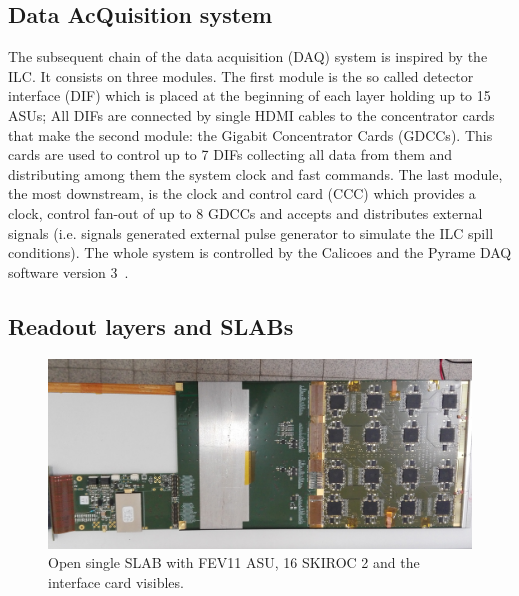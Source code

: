 \documentclass[a4paper,11pt]{article}
\begin{document}
\subsection{Data AcQuisition system}
\label{sec:DAQ}

The subsequent chain of the data acquisition (DAQ)\cite{Gastaldi:2014vaa} system is inspired by the ILC.
It consists on three modules.
The first module is the so called detector interface (DIF) which is placed at the beginning of each layer holding up to 15 ASUs;
All DIFs are connected by single HDMI cables to the concentrator cards that make
the second module: the Gigabit Concentrator Cards (GDCCs).
This cards are used to control up to 7 DIFs collecting all data from them and distributing among them the system clock and fast commands.
The last module, the most downstream, is the clock and control card (CCC) which
provides a clock, control fan-out of up to 8 GDCCs and accepts and distributes external signals (i.e. signals
generated external pulse generator to simulate the ILC spill conditions).
The whole system is controlled by the Calicoes and the Pyrame DAQ software version 3~\cite{Rubio-Roy:2017ere,Magniette:2018wdz}.

\subsection{Readout layers and SLABs}
\label{sec:setup}

\begin{figure}[!t]
  \centering
    \includegraphics[width=6in]{../figs/short_slab_bga.jpg} 
  \caption{Open single SLAB with FEV11 ASU, 16 SKIROC 2 and the interface card visibles. }
\label{ASU2}
\end{figure}
\end{document}
